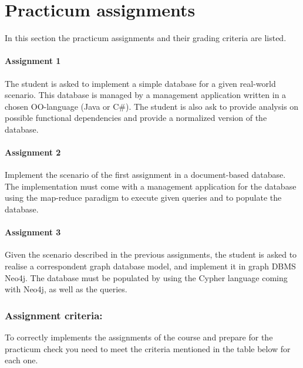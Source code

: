 \section{Practicum assignments}
	In this section the practicum assignments and their grading criteria are listed.
	
	\paragraph*{Assignment 1}
		The student is asked to implement a simple database for a given real-world scenario. This database is managed by a management application written in a chosen OO-language (Java or C\#). The student is also ask to provide analysis on possible functional dependencies and provide a normalized version of the database.

	\paragraph*{Assignment 2}
		Implement the scenario of the first assignment in a document-based database. The implementation must come with a management application for the database using the map-reduce paradigm to execute given queries and to populate the database.

	\paragraph*{Assignment 3}
		Given the scenario described in the previous assignments, the student is asked to realise a correspondent graph database model, and implement it in graph DBMS Neo4j. The database must be populated by using the Cypher language coming with Neo4j, as well as the queries.
		
		\subsubsection*{Assignment criteria:}
		To correctly implements the assignments of the course and prepare for the practicum check you need to meet the criteria mentioned in the table below for each one. 
		
